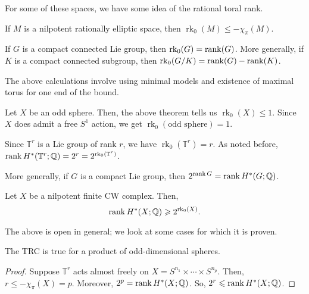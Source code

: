 \documentclass[12pt]{article}
\DeclareMathOperator{\rk}{rk}
\begin{document}
For some of these spaces, we have some idea of the rational toral rank.

\begin{thm}
	If $M$ is a nilpotent rationally elliptic space, then $\rk_{0}(M) \le -\chi_{\pi}(M)$.

	If $G$ is a compact connected Lie group, then $\rk_{0}(G) = \rank(G)$. More generally, if $K$ is a compact connected subgroup, then $\rk_{0}(G/K) = \rank(G) - \rank(K)$.
\end{thm}
The above calculations involve using minimal models and existence of maximal torus for one end of the bound.

\begin{ex}
	Let $X$ be an odd sphere. Then, the above theorem tells us $\rk_{0}(X) \le 1$. Since $X$ does admit a free $S^{1}$ action, we get $\rk_{0}(\text{odd sphere}) = 1$.
\end{ex}

\begin{ex}
	Since $\mathbb{T}^{r}$ is a Lie group of rank $r$, we have $\rk_{0}(\mathbb{T}^{r}) = r$. As noted before, $\rank H^{\ast}(\mathbb{T}^{r}; \mathbb{Q}) = 2^{r} = 2^{\rk_{0}(\mathbb{T}^{r})}$.
\end{ex}

\begin{rem}
	More generally, if $G$ is a compact Lie group, then $2^{\operatorname{rank} G} = \operatorname{rank} H^{\ast}(G; \mathbb{Q})$.
\end{rem}

\begin{conj}
	Let $X$ be a nilpotent finite CW complex. Then,
	\begin{equation*} 
		\rank H^{\ast}(X; \mathbb{Q}) \ge 2^{\rk_{0}(X)}.
	\end{equation*}
\end{conj}
The above is open in general; we look at some cases for which it is proven.

\begin{thm}
	The TRC is true for a product of odd-dimensional spheres.
\end{thm}
\begin{proof} 
	Suppose $\mathbb{T}^{r}$ acts almost freely on $X = S^{n_{1}} \times \cdots \times S^{n_{p}}$. Then, $r \le -\chi_{\pi}(X) = p$. Moreover, $2^{p} = \operatorname{rank} H^{\ast}(X; \mathbb{Q})$. So, $2^{r} \leqslant \operatorname{rank} H^{\ast}(X; \mathbb{Q})$.
\end{proof}
\end{document}
